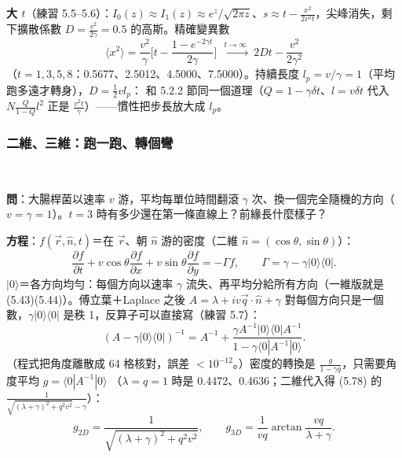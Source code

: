 \textbf{大 $t$}（練習 5.5--5.6）：$I_0(z)\approx I_1(z)\approx e^z/\sqrt{2\pi z}$、$s\approx t-\frac{x^2}{2v^2t}$，尖峰消失，剩下擴散係數 $D=\frac{v^2}{2\gamma}=0.5$ 的高斯。精確變異數
\[\langle x^2\rangle=\frac{v^2}{\gamma}\Big[t-\frac{1-e^{-2\gamma t}}{2\gamma}\Big]\ \xrightarrow{\ t\to\infty\ }\ 2Dt-\frac{v^2}{2\gamma^2}\]
（$t=1,3,5,8$：0.5677、2.5012、4.5000、7.5000）。持續長度 $l_p=v/\gamma=1$（平均跑多遠才轉身），$D=\frac12vl_p$：
和 5.2.2 節同一個道理（$Q=1-\gamma\delta t$、$l=v\delta t$ 代入 $N\frac{Q}{1-Q}l^2$ 正是 $\frac{v^2t}{\gamma}$）——慣性把步長放大成 $l_p$。

\subsubsection{二維、三維：跑一跑、轉個彎}
\leavevmode{}\ \par\nopagebreak

\textbf{問}：大腸桿菌以速率 $v$ 游，平均每單位時間翻滾 $\gamma$ 次、換一個完全隨機的方向（$v=\gamma=1$）。$t=3$ 時有多少還在第一條直線上？前緣長什麼樣子？

\textbf{方程}：$f(\vec r,\hat n,t)$＝在 $\vec r$、朝 $\hat n$ 游的密度（二維 $\hat n=(\cos\theta,\sin\theta)$）：
\[\frac{\partial f}{\partial t}+v\cos\theta\frac{\partial f}{\partial x}+v\sin\theta\frac{\partial f}{\partial y}=-\Gamma f,\qquad \Gamma=\gamma-\gamma|0\rangle\langle0|.\tag{5.65, 5.69}\]
$|0\rangle$＝各方向均勻：每個方向以速率 $\gamma$ 流失、再平均分給所有方向（一維版就是 (5.43)(5.44)）。傅立葉＋Laplace 之後
$A=\lambda+iv\vec q\cdot\hat n+\gamma$ 對每個方向只是一個數，$\gamma|0\rangle\langle0|$ 是秩 1，反算子可以直接寫（練習 5.7）：
\[(A-\gamma|0\rangle\langle0|)^{-1}=A^{-1}+\frac{\gamma A^{-1}|0\rangle\langle0|A^{-1}}{1-\gamma\langle0|A^{-1}|0\rangle}.\tag{5.73--5.75}\]
（程式把角度離散成 64 格核對，誤差 $<10^{-12}$。）密度的轉換是 $\frac{g}{1-\gamma g}$，只需要角度平均 $g=\langle0|A^{-1}|0\rangle$
（$\lambda=q=1$ 時是 0.4472、0.4636；二維代入得 (5.78) 的 $\frac{1}{\sqrt{(\lambda+\gamma)^2+q^2v^2}-\gamma}$）：
\[g_{2D}=\frac{1}{\sqrt{(\lambda+\gamma)^2+q^2v^2}},\qquad g_{3D}=\frac{1}{vq}\arctan\frac{vq}{\lambda+\gamma}.\tag{5.77, 5.93}\]

